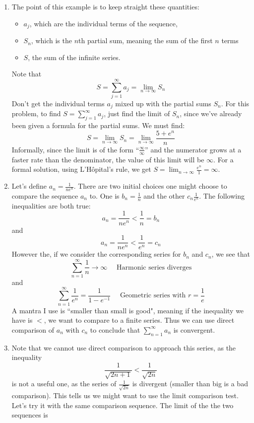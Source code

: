 \documentclass{article}
\begin{document}
    \begin{enumerate}
    \item The point of this example is to keep straight these quantities:
    \begin{itemize}
        \item $a_j$, which are the individual terms of the sequence,
        \item $S_n$, which is the $n$th partial sum, meaning the sum of the first $n$ terms
        \item $S$, the sum of the infinite series. 
        \end{itemize}
        Note that 
        $$S = \displaystyle \sum_{j=1}^\infty a_j = \lim_{n\rightarrow\infty} S_n$$
        Don't get the individual terms $a_j$ mixed up with the partial sums $S_n$.
        For this problem, to find $S=\displaystyle \sum_{j=1}^\infty a_j$, just find the limit of $S_n$, since we've already been given a formula for the partial sums. We must find:
        $$S = \lim_{n\rightarrow\infty} S_n = \lim_{n\rightarrow\infty} \frac{5 + e^n}{n}$$
        Informally,  since the limit is of the form ``$\frac{\infty}{\infty}$'' and the numerator grows at a faster rate than the denominator, the value of this limit will be $\infty$. For a formal solution, 
         using L'H\^{o}pital's rule, we get
        $S = \lim_{n\rightarrow \infty} \frac{e^n}{1} = \infty$.
        \item Let's define $a_n = \frac{1}{ne^n}$. There are two initial choices one might choose to compare the sequence $a_n$ to.  One is $b_n=\frac{1}{n}$ and the other $c_n\frac{1}{e^n}$. The following inequalities are both true:
        \[ a_n= \frac{1}{ne^n}<\frac{1}{n}=b_n\]
        and
        \[ a_n= \frac{1}{ne^n}<\frac{1}{e^n}=c_n\]
        However the, if we consider the corresponding series for $b_n$ and $c_n$, we see that
        \[\sum_{n=1}^\infty \frac{1}{n}\to \infty\quad  \text{ Harmonic series diverges} \]
        and 
        \[\sum_{n=1}^\infty \frac{1}{e^n} =\frac{1}{1-e^{-1}} \quad \text{ Geometric series with } r=\frac{1}{e} \]
        A mantra I use is ``smaller than small is good", meaning if the inequality we have is $<$, we want to compare to a finite series.  Thus we can use direct comparison of $a_n$ with $c_n$ to conclude that $\sum_{n=1}^\infty a_n$ is convergent.
        \item  Note that we cannot use direct comparison to approach this series, as the inequality 
        \[\frac{1}{\sqrt{2n+1}}<\frac{1}{\sqrt{2n}} \]
        is not a useful one, as the series of $\frac{1}{\sqrt{2n}}$ is divergent (smaller than big is a bad comparison).  This tells us we might want to use the limit comparison test. Let's try it with the same comparison sequence. The limit of the the two sequences is

\end{enumerate}
\end{document}
